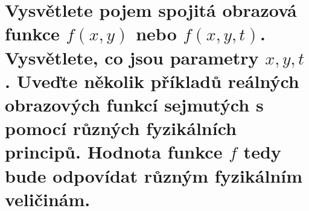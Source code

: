 \section{Vysvětlete pojem spojitá obrazová funkce $f (x, y)$ nebo $f (x, y, t)$. Vysvětlete, co jsou parametry 
$x, y, t$. Uveďte několik příkladů reálných obrazových funkcí sejmutých s pomocí různých fyzikálních principů. Hodnota 
funkce $f$ tedy bude odpovídat různým fyzikálním veličinám.}